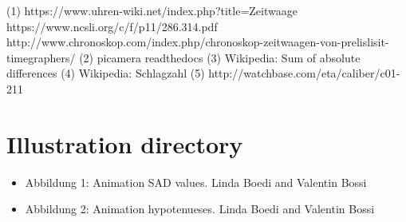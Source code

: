 \documentclass[12pt, a4paper]{report}
\begin{document}
\begin{thebibliography}{9}
\bigskip
{} 
(1) https://www.uhren-wiki.net/index.php?title=Zeitwaage
 https://www.ncsli.org/c/f/p11/286.314.pdf
 http://www.chronoskop.com/index.php/chronoskop-zeitwaagen-von-prelislisit-timegraphers/
\bibitem[Picamera]
(2) picamera readthedocs
\bibitem[SAD]
(3) Wikipedia: Sum of absolute differences
\bibitem[Schlagzahl]
(4) Wikipedia: Schlagzahl
(5) http://watchbase.com/eta/caliber/c01-211
\end{thebibliography}

\pagebreak

\section {Illustration directory}
\bigskip

\begin{itemize}
\item Abbildung 1: Animation SAD values. Linda Boedi and Valentin Bossi
\item Abbildung 2: Animation hypotenueses. Linda Boedi and Valentin Bossi
\end{itemize}
\end{document}

